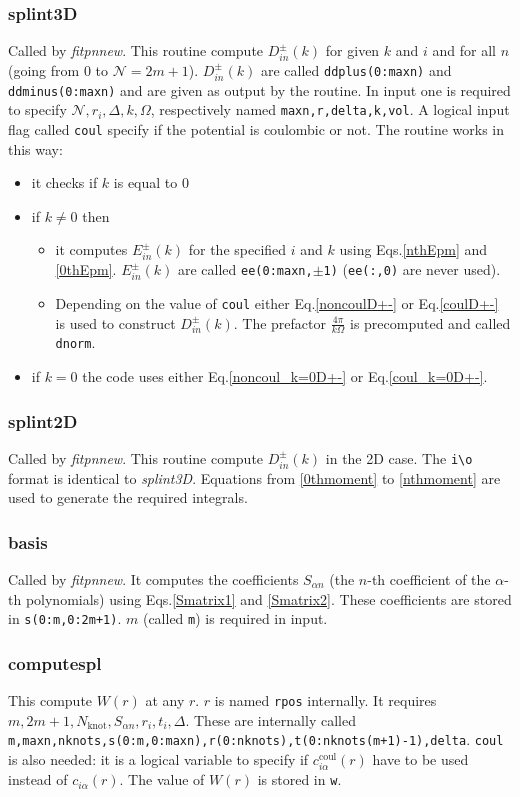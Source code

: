 \documentclass{revtex4}
\begin{document}
\subsubsection*{splint3D}
Called by {\em fitpnnew}. This routine compute $D^\pm_{in}(k)$ for given 
$k$ and $i$ and for all
$n$ (going from $0$ to $\mathcal{N}=2m+1$). $D^\pm_{in}(k)$ are called 
\verb!ddplus(0:maxn)! and \verb!ddminus(0:maxn)! and are given as output
by the routine. In input one is required to specify $\mathcal{N},r_i,\Delta,k,\Omega$,
respectively named \verb!maxn,r,delta,k,vol!. A logical input flag called 
\verb!coul! specify if the potential is coulombic or not. The routine works
in this way:
\begin{itemize}
\item it checks if $k$ is equal to 0
\item if $k\ne 0$ then
  \begin{itemize}
  \item it computes $E^\pm_{in}(k)$ for the specified $i$ and $k$ using Eqs.\ref{nthEpm} and
      \ref{0thEpm}. $E^\pm_{in}(k)$ are called \verb!ee(0:maxn,!$\pm$\verb!1)! 
      (\verb!ee(:,0)! are never used).
  \item Depending on the value of \verb!coul! either Eq.\ref{noncoulD+-} or Eq.\ref{coulD+-} 
      is used to construct $D^\pm_{in}(k)$. The prefactor $\frac{4\pi}{k \Omega}$ 
      is precomputed and called \verb!dnorm!.
  \end{itemize}
\item if $k=0$ the code uses either Eq.\ref{noncoul_k=0D+-} or Eq.\ref{coul_k=0D+-}.
\end{itemize}

\subsubsection*{splint2D}
Called by {\em fitpnnew}. This routine compute $D^\pm_{in}(k)$ in the 2D case.
The \verb!i\o! format is identical to {\em splint3D}. Equations from \ref{0thmoment}
to \ref{nthmoment} are used to generate the required integrals.


\subsubsection*{basis}
Called by {\em fitpnnew}. It computes the coefficients $S_{\alpha n}$ (the $n$-th 
coefficient of the $\alpha$-th polynomials) using Eqs.\ref{Smatrix1} and \ref{Smatrix2}.
These coefficients are stored in \verb!s(0:m,0:2m+1)!. $m$ (called \verb!m!) 
is required in input.

\subsubsection*{computespl}
This compute $W(r)$ at any $r$. $r$ is named \verb!rpos! internally. It requires
$m,2m+1,N_\text{knot},S_{\alpha n},r_i,t_i,\Delta$. These are internally called
\verb!m,maxn,nknots,s(0:m,0:maxn),r(0:nknots),t(0:nknots(m+1)-1),delta!. 
\verb!coul! is also needed: it is a logical variable 
to specify if $c_{i\alpha}^\text{coul}(r)$ have to be used instead of $c_{i\alpha}(r)$.
The value of $W(r)$ is stored in \verb!w!.
\end{document}
